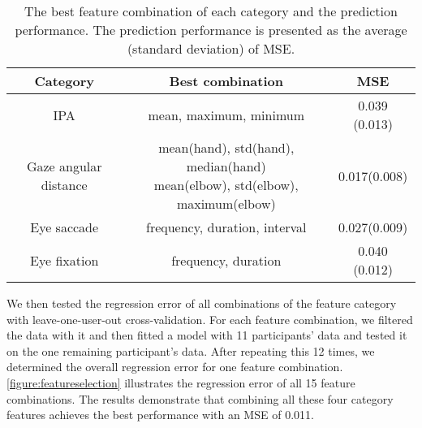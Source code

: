 \begin{table*}[htb]
  \centering
  \small
    \begin{tabular}[width=\columnwidth]{ccc}
    \toprule
    \textbf{Category} & \textbf{Best combination} & \textbf{MSE}\\
    \midrule
    IPA & mean, maximum, minimum & 0.039 (0.013) \\
    Gaze angular distance & \makecell{mean(hand), std(hand), median(hand) \\ mean(elbow), std(elbow), maximum(elbow)} & 0.017(0.008) \\
    Eye saccade & frequency, duration, interval & 0.027(0.009) \\
    Eye fixation & frequency, duration & 0.040 (0.012) \\
    \bottomrule
    \end{tabular}
    \caption{The best feature combination of each category and the prediction performance. The prediction performance is presented as the average (standard deviation) of MSE.}
    \label{table:featureselection}
\end{table*}

We then tested the regression error of all combinations of the feature category with leave-one-user-out cross-validation.
For each feature combination, we filtered the data with it and then fitted a model with 11 participants' data and tested it on the one remaining participant's data.
After repeating this 12 times, we determined the overall regression error for one feature combination.
\autoref{figure:featureselection} illustrates the regression error of all 15 feature combinations.
The results demonstrate that combining all these four category features achieves the best performance with an MSE of 0.011.


